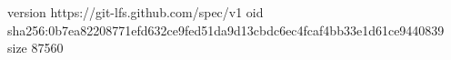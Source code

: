 version https://git-lfs.github.com/spec/v1
oid sha256:0b7ea82208771efd632ce9fed51da9d13cbdc6ec4fcaf4bb33e1d61ce9440839
size 87560
